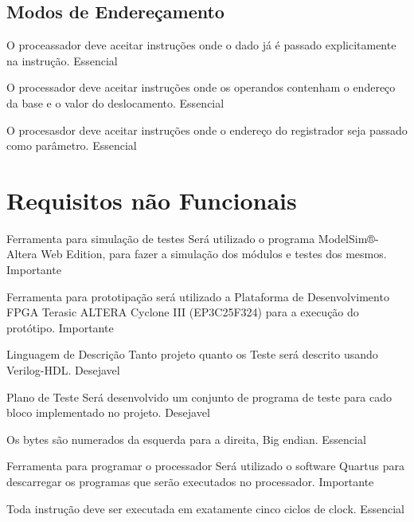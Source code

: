 \documentclass{article}
\begin{document}
     \subsection{Modos de Endereçamento}

    \begin{functional}

      {O proceassador deve aceitar instruções onde o dado já é passado explicitamente na instrução.}
      {Essencial}


      {O processador deve aceitar instruções onde os operandos contenham o endereço da base e o valor do deslocamento.}
      {Essencial}

      {O procesasdor deve aceitar instruções onde o endereço do registrador seja passado como parâmetro.}
      {Essencial}

     \end{functional}


\section{Requisitos não Funcionais}

  \begin{nonfunctional}

    \requirement
    {Ferramenta para simulação de testes}
    {Será utilizado o programa ModelSim®-Altera Web Edition, para fazer a simulação dos módulos e testes dos mesmos.}
    {Importante}

    \requirement
    {Ferramenta para prototipação}
    {será utilizado a Plataforma de Desenvolvimento FPGA  Terasic ALTERA Cyclone III (EP3C25F324) para a execução do protótipo.}
    {Importante}

    \requirement
    {Linguagem de Descrição}
    {Tanto projeto quanto os Teste será descrito usando Verilog-HDL.}
    {Desejavel}

    \requirement
    {Plano de Teste}
    {Será desenvolvido um conjunto de programa de teste para cado bloco implementado no projeto. }
    {Desejavel}

    {Os bytes são numerados da esquerda para a direita, Big endian.}
    {Essencial}

    \requirement
    {Ferramenta para programar o processador}
    {Será utilizado o software Quartus para descarregar os programas que serão executados no processador.}
    {Importante}


      {Toda instrução deve ser executada em exatamente cinco ciclos de clock.}
      {Essencial}

  \end{nonfunctional}
\end{document}
